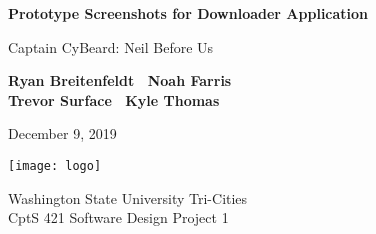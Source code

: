 \begin{titlepage}
    \begin{center}
        \vspace*{1cm}

        \Huge
        \textbf{Prototype Screenshots for Downloader Application}

        \vspace{.5cm}
        \LARGE
        Captain CyBeard: Neil Before Us

        \vspace{1cm}

        \textbf{Ryan Breitenfeldt \textbar\ Noah Farris\\ Trevor Surface \textbar\ Kyle Thomas}

        \vspace{.2cm}
        \Large
        December 9, 2019

        \vspace{2cm}
        \texttt{[image: logo]}

        \vfill

        Washington State University Tri-Cities\\
        CptS 421 Software Design Project 1

    \end{center}
\end{titlepage}


